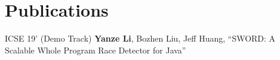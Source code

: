 \documentclass[12pt,letterpaper]{report}
\begin{document}
	


	\section*{Publications}
	\begin{tablist}
		\item[ICSE 19'] \tab (Demo Track) \textbf{Yanze Li}, Bozhen Liu, Jeff Huang, \enquote{SWORD: A Scalable Whole Program Race Detector for Java}
	\end{tablist}
	
	
	
%	
%	
%		
%		
%		
%	
%	
%	
%	
%		
%		
%	
%	
%	
%	
%		
\end{document}
